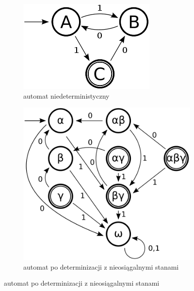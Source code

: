 {	
	\begin{figure}[h]
		\centering
		\begin{subfigure}[b]{0.3\textwidth}
			\includegraphics[width=\textwidth]{18/naut}
			\caption{automat niedeterministyczny}
			\label{a}
		\end{subfigure}
		\begin{subfigure}[b]{0.3\textwidth}
			\includegraphics[width=\textwidth]{18/daut1}
			\caption{automat po determinizacji z nieosiągalnymi stanami}
			\label{b}
		\end{subfigure}

\end{figure}}
